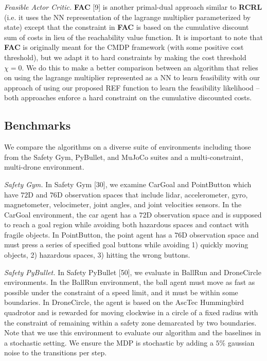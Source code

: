 \documentclass{article}
\theoremstyle{definition}
\begin{document}
\emph{Feasible Actor Critic.} \textbf{FAC} [9] is another primal-dual approach similar to \textbf{RCRL} (i.e. it uses the NN representation of the lagrange multiplier parameterized by state) except that the constraint in \textbf{FAC} is based on the cumulative discount sum of costs in lieu of the reachability value function. It is important to note that \textbf{FAC} is originally meant for the CMDP framework (with some positive cost threshold), but we adapt it to hard constraints by making the cost threshold $\chi=0$. We do this to make a better comparison between an algorithm that relies on using the lagrange multiplier represented as a NN to learn feasibility with our approach of using our proposed REF function to learn the feasibility likelihood -- both approaches enforce a hard constraint on the cumulative discounted costs.

\subsection{Benchmarks}
We compare the algorithms on a diverse suite of environments including those from the Safety Gym, PyBullet, and MuJoCo suites and a multi-constraint, multi-drone environment.

\emph{Safety Gym.} In Safety Gym [30], we examine CarGoal and PointButton which have $72$D and $76$D observation spaces that include lidar, accelerometer, gyro, magnetometer, velocimeter, joint angles, and joint velocities sensors. In the CarGoal environment, the car agent has a $72$D observation space and is supposed to reach a goal region while avoiding both hazardous spaces and contact with fragile objects. In PointButton, the point agent has a $76$D observation space and must press a series of specified goal buttons while avoiding 1) quickly moving objects, 2) hazardous spaces, 3) hitting the wrong buttons.

\emph{Safety PyBullet.} In Safety PyBullet [50], we evaluate in BallRun and DroneCircle environments. In the BallRun environment, the ball agent must move as fast as possible under the constraint of a speed limit, and it must be within some boundaries. In DroneCircle, the agent is based on the AscTec Hummingbird quadrotor and is rewarded for moving clockwise in a circle of a fixed radius with the constraint of remaining within a safety zone demarcated by two boundaries. Note that we use this environment to evaluate our algorithm and the baselines in a stochastic setting. We ensure the MDP is stochastic by adding a $5\%$ gaussian noise to the transitions per step. 
\end{document}
